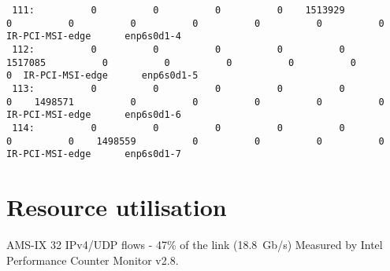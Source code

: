 \begin{lstlisting}
 111:          0          0          0          0    1513929          0          0          0          0          0          0          0  IR-PCI-MSI-edge      enp6s0d1-4
 112:          0          0          0          0          0    1517085          0          0          0          0          0          0  IR-PCI-MSI-edge      enp6s0d1-5
 113:          0          0          0          0          0          0    1498571          0          0          0          0          0  IR-PCI-MSI-edge      enp6s0d1-6
 114:          0          0          0          0          0          0          0    1498559          0          0          0          0  IR-PCI-MSI-edge      enp6s0d1-7
\end{lstlisting}
















\section{Resource utilisation}
AMS-IX 32 IPv4/UDP flows - 47\% of the link (18.8~Gb/s)
Measured by Intel Performance Counter Monitor v2.8.

